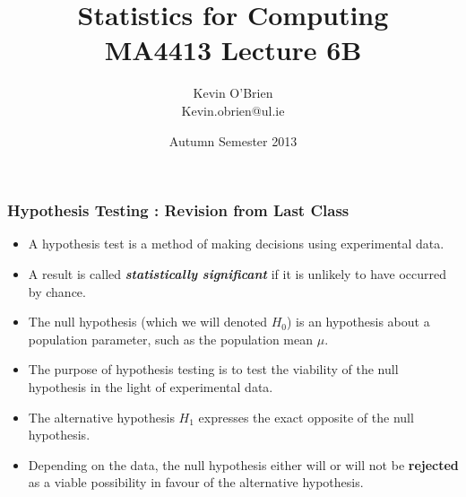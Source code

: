 \documentclass[a4]{beamer}
\title[MA4413]{Statistics for Computing \\ {\normalsize MA4413 Lecture 6B}}
\author[Kevin O'Brien]{Kevin O'Brien \\ {\scriptsize Kevin.obrien@ul.ie}}
\date{Autumn Semester 2013}
\institute[Maths \& Stats]{Dept. of Mathematics \& Statistics, \\ University \textit{of} Limerick}
\begin{document}
\begin{frame}
\titlepage
\end{frame}




\begin{frame}
\frametitle{Hypothesis Testing : Revision from Last Class}
\large
\begin{itemize} \item
A hypothesis test is a method of making decisions using experimental data. \item A result is called \textbf{\emph{statistically significant}} if it is unlikely to have occurred by chance.





\item The null hypothesis (which we will denoted $H_0$) is an hypothesis about a population parameter, such as the population mean $\mu$. \item The purpose of hypothesis testing is to test the viability of the null hypothesis in the light of experimental data. \item The alternative hypothesis $H_1$ expresses the exact opposite of the null hypothesis. \item Depending on the data, the null hypothesis either will or will not be \textbf{rejected} as a viable possibility in favour of the alternative hypothesis.
\end{itemize}

\end{frame}
\end{document}
